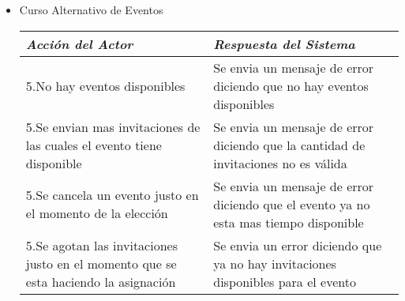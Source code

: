 \begin{itemize}
	\item Curso Alternativo de Eventos\\
		\begin{tabular}{|p{6.6cm}|p{6.6cm}|}\hline
			\emph{Acción del Actor} & \emph{Respuesta del Sistema}\\\hline
			5.No hay eventos disponibles&Se envia un mensaje de error diciendo que no hay eventos disponibles\\\hline
			5.Se envian mas invitaciones de las cuales el evento tiene disponible&Se envia un mensaje de error diciendo que la cantidad de invitaciones no es válida\\\hline
			5.Se cancela un evento justo en el momento de la elección&Se envia un mensaje de error diciendo que el evento ya no esta mas tiempo disponible\\\hline
			5.Se agotan las invitaciones justo en el momento que se esta haciendo la asignación&Se envia un error diciendo que ya no hay invitaciones disponibles para el evento\\\hline
		\end{tabular}

\end{itemize}
